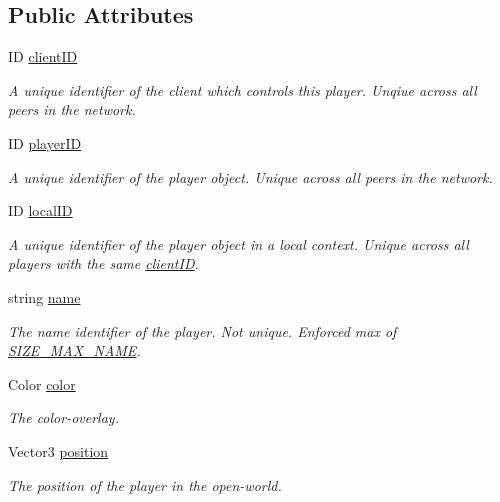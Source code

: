 \subsection*{Public Attributes}
\begin{DoxyCompactItemize}
\item 
I\-D \hyperlink{class_game_state_1_1_player_aacc123df8ea5256f83c1060a5fdd19c2}{client\-I\-D}
\begin{DoxyCompactList}\small\item\em A unique identifier of the client which controls this player. Unqiue across all peers in the network. \end{DoxyCompactList}\item 
I\-D \hyperlink{class_game_state_1_1_player_acbd28d89e6eb8611aa66452ec31e9133}{player\-I\-D}
\begin{DoxyCompactList}\small\item\em A unique identifier of the player object. Unique across all peers in the network. \end{DoxyCompactList}\item 
I\-D \hyperlink{class_game_state_1_1_player_ae0383475b3348fb85ba5be64433443ff}{local\-I\-D}
\begin{DoxyCompactList}\small\item\em A unique identifier of the player object in a local context. Unique across all players with the same \hyperlink{class_game_state_1_1_player_aacc123df8ea5256f83c1060a5fdd19c2}{client\-I\-D}. \end{DoxyCompactList}\item 
string \hyperlink{class_game_state_1_1_player_afc2b145df544ca5bffc7c87ef294bcde}{name}
\begin{DoxyCompactList}\small\item\em The name identifier of the player. Not unique. Enforced max of \hyperlink{class_game_state_1_1_player_a1cdc9de8183b220e87632f7f6a7147d0}{S\-I\-Z\-E\-\_\-\-M\-A\-X\-\_\-\-N\-A\-M\-E}. \end{DoxyCompactList}\item 
Color \hyperlink{class_game_state_1_1_player_a38366fae101c03655d90443f174e362d}{color}
\begin{DoxyCompactList}\small\item\em The color-\/overlay. \end{DoxyCompactList}\item 
Vector3 \hyperlink{class_game_state_1_1_player_a24a9ccd0325cae667f125821b3be79c2}{position}
\begin{DoxyCompactList}\small\item\em The position of the player in the open-\/world. \end{DoxyCompactList}\item 

\end{DoxyCompactItemize}

